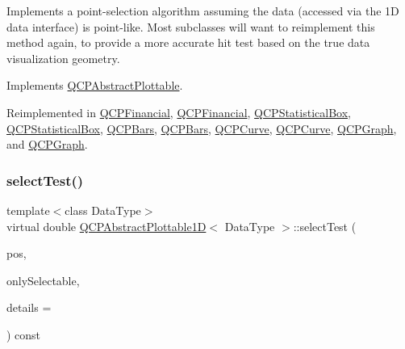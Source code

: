Implements a point-\/selection algorithm assuming the data (accessed via the 1D data interface) is point-\/like. Most subclasses will want to reimplement this method again, to provide a more accurate hit test based on the true data visualization geometry.

Implements \hyperlink{class_q_c_p_abstract_plottable_a38efe9641d972992a3d44204bc80ec1d}{Q\+C\+P\+Abstract\+Plottable}.



Reimplemented in \hyperlink{class_q_c_p_financial_aac8e91622ac58330fa9ce81cc8fd40ee}{Q\+C\+P\+Financial}, \hyperlink{class_q_c_p_financial_a6067c625621b07a85a6989a0a4b8d309}{Q\+C\+P\+Financial}, \hyperlink{class_q_c_p_statistical_box_a1607fa92f829c631107c20ccb2d70a6d}{Q\+C\+P\+Statistical\+Box}, \hyperlink{class_q_c_p_statistical_box_ae78bfe096f463a8d08464c20cc25defe}{Q\+C\+P\+Statistical\+Box}, \hyperlink{class_q_c_p_bars_a121f899c27af3186fe93dcd0eb98f49b}{Q\+C\+P\+Bars}, \hyperlink{class_q_c_p_bars_a7b282a2932c7c0b4a45bd61e8c490153}{Q\+C\+P\+Bars}, \hyperlink{class_q_c_p_curve_a0ed9b7e6b4bc72010d6fcd974af46a8b}{Q\+C\+P\+Curve}, \hyperlink{class_q_c_p_curve_a0b3f4916f33b692508a6a1292b46880e}{Q\+C\+P\+Curve}, \hyperlink{class_q_c_p_graph_a6d669d04462d272c6aa0e5f85846d673}{Q\+C\+P\+Graph}, and \hyperlink{class_q_c_p_graph_ab70a737dabcedbd4da4a0bc5a9cff60e}{Q\+C\+P\+Graph}.

\mbox{\label{class_q_c_p_abstract_plottable1_d_ab69f71c97019e44699599e654d382a98}} 
\subsubsection{\texorpdfstring{select\+Test()}{selectTest()}\hspace{0.1cm}{\footnotesize\ttfamily [2/2]}}
{\footnotesize\ttfamily template$<$class Data\+Type$>$ \\
virtual double \hyperlink{class_q_c_p_abstract_plottable1_d}{Q\+C\+P\+Abstract\+Plottable1D}$<$ Data\+Type $>$\+::select\+Test (\begin{DoxyParamCaption}\item[{const Q\+PointF \&}]{pos,  }\item[{bool}]{only\+Selectable,  }\item[{Q\+Variant $\ast$}]{details = {} }\end{DoxyParamCaption}) const\hspace{0.3cm}{\ttfamily [virtual]}}

